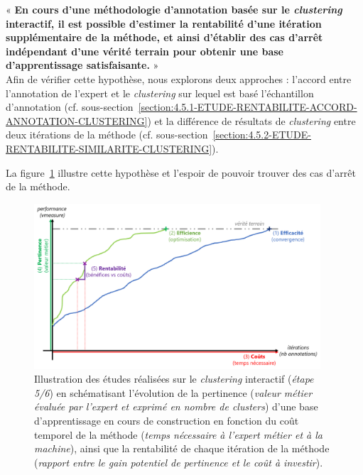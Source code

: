 	\begin{tcolorbox}[
		title=\faVial~\textbf{Hypothèse de rentabilité}~\faVial,
		colback=colorTcolorboxHypothesis!15,  %
		colframe=colorTcolorboxHypothesis!75,  %
		width=\linewidth
	]
		« \textbf{
			En cours d'une méthodologie d'annotation basée sur le \textit{clustering} interactif, il est possible d'estimer la rentabilité d'une itération supplémentaire de la méthode, et ainsi d'établir des cas d'arrêt indépendant d'une vérité terrain pour obtenir une base d’apprentissage satisfaisante.
		} » \\
		
		Afin de vérifier cette hypothèse, nous explorons deux approches : l'accord entre l'annotation de l'expert et le \textit{clustering} sur lequel est basé l'échantillon d'annotation (cf. sous-section~\ref{section:4.5.1-ETUDE-RENTABILITE-ACCORD-ANNOTATION-CLUSTERING}) et la différence de résultats de \textit{clustering} entre deux itérations de la méthode (cf. sous-section~\ref{section:4.5.2-ETUDE-RENTABILITE-SIMILARITE-CLUSTERING}).
		
		La figure~\ref{figure:4.5-HYPOTHESE-RENTABILITE} illustre cette hypothèse et l'espoir de pouvoir trouver des cas d'arrêt de la méthode.
		\begin{figure}[H]  %
			\centering
			\includegraphics[width=0.95\textwidth]{figures/hypotheses-05-rentabilite}
			\caption{Illustration des études réalisées sur le \textit{clustering} interactif (\textit{étape 5/6}) en schématisant l'évolution de la pertinence (\textit{valeur métier évaluée par l'expert et exprimé en nombre de clusters}) d'une base d'apprentissage en cours de construction en fonction du coût temporel de la méthode (\textit{temps nécessaire à l'expert métier et à la machine}), ainsi que la rentabilité de chaque itération de la méthode (\textit{rapport entre le gain potentiel de pertinence et le coût à investir}).}
			\label{figure:4.5-HYPOTHESE-RENTABILITE}
		\end{figure}

	\end{tcolorbox}
	
